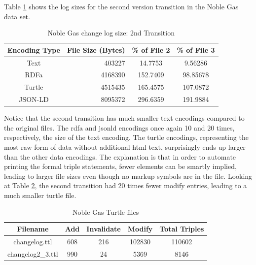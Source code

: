 Table \ref{table:Ng_changelog_table2} shows the \gls{log} sizes for the second version transition in the Noble Gas data set.
\begin{table}
	\caption{Noble Gas change log size: 2nd Transition}
	\label{table:Ng_changelog_table2}
	\centering
	\begin{tabular}{|c|r|c|c|}
		\hline
		Encoding Type & File Size (Bytes) & \% of File 2 & \% of File 3 \\
		\hline
		Text&	403227&	14.7753&	9.56286\\
		RDFa&	4168390&	152.7409&	98.85678\\
		Turtle&	4515435&	165.4575&	107.0872\\
		JSON-LD&	8095372&	296.6359&	191.9884\\
		\hline
	\end{tabular}
\end{table}
Notice that the second transition has much smaller text encodings compared to the original files.
The \gls{rdfa} and \gls{jsonld} encodings once again 10 and 20 times, respectively, the size of the text encoding.
The turtle encodings, representing the most raw form of data without additional \gls{html} text, surprisingly ends up larger than the other data encodings.
The explanation is that in order to automate printing the formal triple statements, fewer elements can be smartly implied, leading to larger file sizes even though no markup symbols are in the file.
Looking at Table \ref{table:Ng_turtle}, the second transition had 20 times fewer \gls{modify} entries, leading to a much smaller turtle file.
\begin{table}
	\caption{Noble Gas Turtle files}
	\label{table:Ng_turtle}
	\centering
	\begin{tabular}{|c|c|c|c|c|}
		\hline
		Filename&	Add&	Invalidate&	Modify&	Total Triples\\ \hline
		changelog.ttl&	608&	216&	102830&	110602\\
		changelog2\_3.ttl&	990&	24&	5369&	8146\\
		\hline
	\end{tabular}
\end{table}

